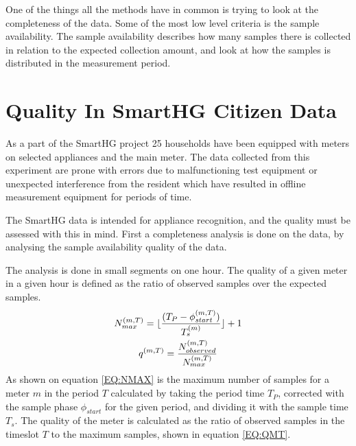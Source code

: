 One of the things all the methods have in common is trying to look at the completeness of the data. Some of the most low level criteria is the sample availability. The sample availability describes how many samples there is collected in relation to the expected collection amount, and look at how the samples is distributed in the measurement period.  


\section{Quality In SmartHG Citizen Data}
As a part of the SmartHG project 25 households have been equipped with meters on selected appliances and the main meter. The data collected from this experiment are prone with errors due to malfunctioning test equipment or unexpected interference from the resident which have resulted in offline measurement equipment for periods of time. 

The SmartHG data is intended for appliance recognition, and the quality must be assessed with this in mind. First a completeness analysis is done on the data, by analysing the sample availability quality of the data. 

The analysis is done in small segments on one hour. The quality of a given meter in a given hour is defined as the ratio of observed samples over the expected samples. 
\begin{gather}
		N_{max}^{(m,T)} = \lfloor \frac{(T_{P}-\phi_{start}^{(m,T)})}{T_s^{(m)}}\rfloor + 1 \label{EQ:NMAX} \\
		q^{(m,T)} = \frac{N_{observed}^{(m,T)}}{ N_{max}^{(m,T)} } \label{EQ:QMT}
\end{gather}
As shown on equation \ref{EQ:NMAX} is the maximum number of samples for a meter $m$ in the period $T$ calculated by taking the period time $T_P$, corrected with the sample phase $\phi_{start}$ for the given period, and dividing it with the sample time $T_s$. The quality of the meter is calculated as the ratio of observed samples in the timeslot $T$ to the maximum samples, shown in equation \ref{EQ:QMT}. 

